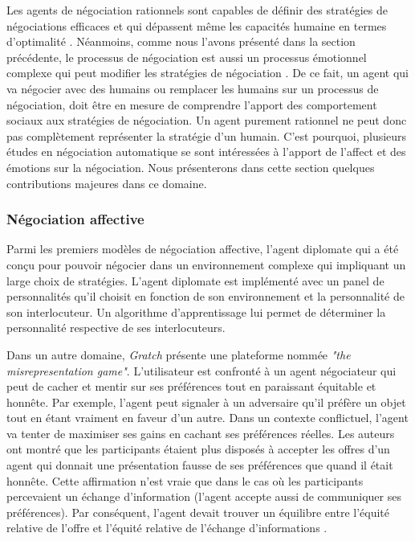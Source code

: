 	 Les agents de négociation rationnels sont capables de définir des stratégies de négociations efficaces et qui dépassent même les capacités humaine en termes d'optimalité \cite{jonker2012negotiating}. Néanmoins, comme nous l'avons présenté dans la section précédente, le processus de négociation est aussi un processus émotionnel complexe qui peut modifier les stratégies de négociation \cite{broekens2010affective}. 
	 De ce fait, un agent qui va négocier avec des humains ou remplacer les humains sur un processus de négociation, doit être en mesure de comprendre l'apport des comportement sociaux aux stratégies de négociation. Un agent purement rationnel ne peut donc pas complètement représenter la stratégie d'un humain. 
	 C'est pourquoi, plusieurs études en négociation automatique se sont intéressées à l'apport de l'affect et des émotions sur la négociation. Nous présenterons dans cette section quelques contributions majeures dans ce domaine. 
	 
	  \subsubsection{Négociation affective}
	  
	 Parmi les premiers modèles de négociation affective, l'agent diplomate \cite{kraus1995designing} qui a été conçu pour pouvoir négocier dans un environnement complexe qui impliquant un large choix de stratégies. L'agent diplomate est implémenté avec un panel de personnalités qu'il choisit en fonction de son environnement et la personnalité de son interlocuteur.  Un algorithme d'apprentissage lui permet de déterminer la personnalité respective de ses interlocuteurs. 
	 
	 Dans un autre domaine, \emph{Gratch} \cite{gratch2016misrepresentation} présente une plateforme nommée \emph{"the misrepresentation game"}. L'utilisateur est confronté à un agent négociateur qui peut de cacher et mentir sur ses préférences tout en paraissant équitable et honnête. Par exemple, l'agent peut signaler à un adversaire qu'il préfère un objet tout en étant vraiment en faveur d'un autre. Dans un contexte conflictuel, l'agent va tenter de maximiser ses gains en cachant ses préférences réelles. Les auteurs ont montré que les participants étaient plus disposés à accepter les offres d'un agent qui donnait une présentation fausse de ses préférences que quand il était honnête. Cette affirmation n'est vraie que dans le cas où les participants percevaient un échange d'information (l'agent accepte aussi de communiquer ses  préférences). Par conséquent, l'agent devait trouver un équilibre entre l'équité relative de l'offre et l'équité relative de l'échange d'informations \cite{gratch2016misrepresentation}.
	 
